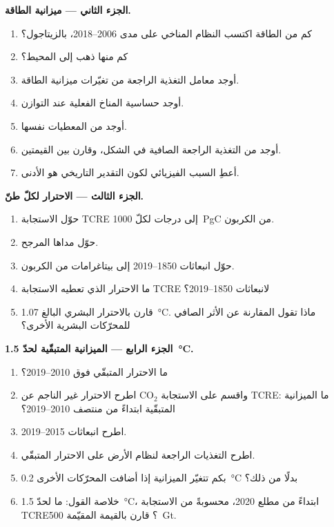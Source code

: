 \begin{problem}
\noindent\textbf{الجزء الثاني --- ميزانية الطاقة.}
\begin{enumerate}[resume]
  \item كم من الطاقة اكتسب النظام المناخي على مدى 2006--2018، بالزيتاجول؟
  \item كم منها ذهب إلى المحيط؟
  \item أوجد معامل التغذية الراجعة من تغيّرات ميزانية الطاقة.
  \item أوجد حساسية المناخ الفعلية عند التوازن.
  \item أوجد  من المعطيات نفسها.
  \item أوجد  من التغذية الراجعة الصافية في الشكل، وقارن بين القيمتين.
  \item أعطِ السبب الفيزيائي لكون التقدير التاريخي هو الأدنى.
\end{enumerate}

\noindent\textbf{الجزء الثالث --- الاحترار لكلّ طنّ.}
\begin{enumerate}[resume]
  \item حوّل الاستجابة TCRE إلى درجات لكلّ \qty{1000}{PgC} من الكربون.
  \item حوّل مداها المرجح.
  \item حوّل انبعاثات 1850--2019 إلى بيتاغرامات من الكربون.
  \item ما الاحترار الذي تعطيه الاستجابة TCRE لانبعاثات 1850--2019؟
  \item قارن بالاحترار البشري البالغ \qty{1.07}{\celsius}. ماذا تقول المقارنة عن
        الأثر الصافي للمحرّكات البشرية الأخرى؟
\end{enumerate}

\noindent\textbf{الجزء الرابع --- الميزانية المتبقّية لحدّ \qty{1.5}{\celsius}.}
\begin{enumerate}[resume]
  \item ما الاحترار المتبقّي فوق 2010--2019؟
  \item اطرح الاحترار غير الناجم عن CO$_2$ واقسم على الاستجابة TCRE: ما الميزانية المتبقّية ابتداءً من منتصف
        2010--2019؟
  \item اطرح انبعاثات 2015--2019.
  \item اطرح التغذيات الراجعة لنظام الأرض على الاحترار المتبقّي.
  \item بكم تتغيّر الميزانية إذا أضافت المحرّكات الأخرى \qty{0.2}{\celsius} بدلًا من ذلك؟
  \item خلاصة القول: ما  لحدّ \qty{1.5}{\celsius}، ابتداءً من مطلع
        2020، محسوبةً من الاستجابة TCRE؟ قارن بالقيمة المقيّمة \qty{500}{Gt}.
\end{enumerate}
\end{problem}

